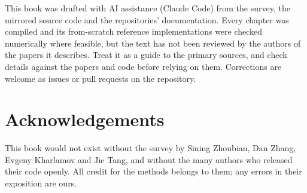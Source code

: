 This book was drafted with AI assistance (Claude Code) from the survey, the mirrored source
code and the repositories' documentation. Every chapter was compiled and its from-scratch
reference implementations were checked numerically where feasible, but the text has not been
reviewed by the authors of the papers it describes. Treat it as a guide to the primary
sources, and check details against the papers and code before relying on them. Corrections
are welcome as issues or pull requests on the repository.

\section*{Acknowledgements}

This book would not exist without the survey by Sining Zhoubian, Dan Zhang, Evgeny Kharlamov
and Jie Tang, and without the many authors who released their code openly. All credit for the
methods belongs to them; any errors in their exposition are ours.
